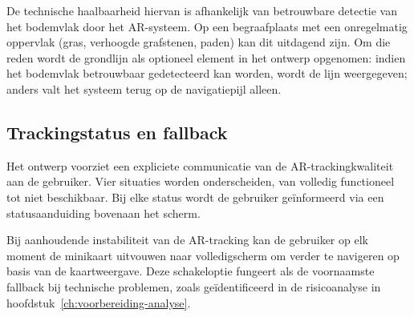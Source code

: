 De technische haalbaarheid hiervan is afhankelijk van betrouwbare detectie van het bodemvlak door het AR-systeem. Op een begraafplaats met een onregelmatig oppervlak (gras, verhoogde grafstenen, paden) kan dit uitdagend zijn. Om die reden wordt de grondlijn als optioneel element in het ontwerp opgenomen: indien het bodemvlak betrouwbaar gedetecteerd kan worden, wordt de lijn weergegeven; anders valt het systeem terug op de navigatiepijl alleen.

\subsection{Trackingstatus en fallback}

Het ontwerp voorziet een expliciete communicatie van de AR-trackingkwaliteit aan de gebruiker. Vier situaties worden onderscheiden, van volledig functioneel tot niet beschikbaar. Bij elke status wordt de gebruiker geïnformeerd via een statusaanduiding bovenaan het scherm.

Bij aanhoudende instabiliteit van de AR-tracking kan de gebruiker op elk moment de minikaart uitvouwen naar volledigscherm om verder te navigeren op basis van de kaartweergave. Deze schakeloptie fungeert als de voornaamste fallback bij technische problemen, zoals geïdentificeerd in de risicoanalyse in hoofdstuk~\ref{ch:voorbereiding-analyse}.